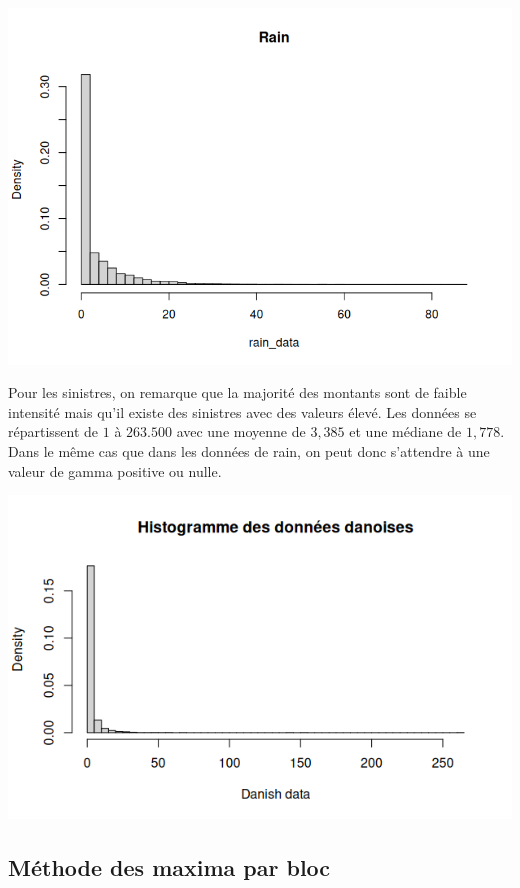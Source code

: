 \documentclass{article}
\theoremstyle{plain}
\theoremstyle{definition}
\theoremstyle{plain}
\begin{document}
\begin{center}
	\includegraphics[scale=0.62]{./images/rainhisto.png} 
\end{center}


\noindent Pour les sinistres, on remarque que la majorité des montants sont de faible intensité mais qu'il existe des sinistres avec des valeurs élevé. Les données se répartissent de $1$ à $263.500$ avec une moyenne de $3,385$ et une médiane de $1,778$. Dans le même cas que dans les données de rain, on peut donc s'attendre à une valeur de gamma positive ou nulle.
\begin{center}
	\includegraphics[scale=0.62]{./images/sinistres.png} 
\end{center}

\subsection{Méthode des maxima par bloc}
\end{document}
